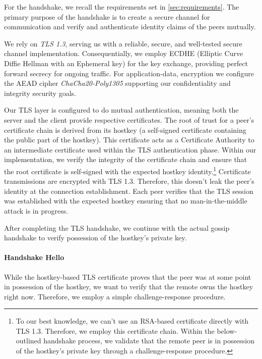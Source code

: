 For the handshake, we recall the requirements set in \autoref{sec:requirements}.
The primary purpose of the handshake is to create a secure channel for communication and verify
and authenticate identity claims of the peers mutually.

We rely on \textit{TLS 1.3}, serving us with a reliable, secure, and well-tested secure channel implementation.
Consequentially, we employ ECDHE (Elliptic Curve Diffie Hellman with an Ephemeral key) for the key exchange,
providing perfect forward secrecy for ongoing traffic.
For application-data, encryption we configure the AEAD cipher \textit{ChaCha20-Poly1305} supporting our confidentiality
and integrity security goals.

Our TLS layer is configured to do mutual authentication, meaning both the server and the client provide respective
certificates.
The root of trust for a peer's certificate chain is derived from its hostkey (a self-signed certificate containing
the public part of the hostkey).
This certificate acts as a Certificate Authority to an intermediate certificate used within the TLS authentication phase.
Within our  implementation, we verify the integrity of the certificate chain and ensure that
the root certificate is self-signed with the expected hostkey identity.\footnote{
To our best knowledge, we can't use an RSA-based certificate directly with TLS 1.3. Therefore, we employ this certificate chain.
Within the below-outlined handshake process, we validate that the remote peer is in possession of the hostkey's private key
    through a challenge-response procedure.
}
Certificate transmissions are encrypted with TLS 1.3.
Therefore, this doesn't leak the peer's identity at the connection establishment.
Each peer verifies that the TLS session was established with the expected hostkey ensuring that no man-in-the-middle
attack is in progress.

After completing the TLS handshake, we continue with the actual gossip handshake to verify possession of
the hostkey's private key.

\paragraph{Handshake Hello}

While the hostkey-based TLS certificate proves that the peer was at some point in possession of the hostkey,
we want to verify that the remote owns the hostkey right now.
Therefore, we employ a simple challenge-response procedure.

